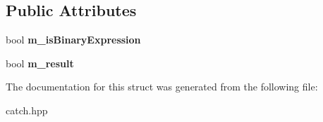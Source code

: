 \subsection*{Public Attributes}
\begin{DoxyCompactItemize}
\item 
bool {\bfseries m\+\_\+is\+Binary\+Expression}\hypertarget{structCatch_1_1ITransientExpression_a75ce48da824d514d08152d396abb28d8}{}\label{structCatch_1_1ITransientExpression_a75ce48da824d514d08152d396abb28d8}

\item 
bool {\bfseries m\+\_\+result}\hypertarget{structCatch_1_1ITransientExpression_a4646e2b5e0156e913653ec3b9b60c942}{}\label{structCatch_1_1ITransientExpression_a4646e2b5e0156e913653ec3b9b60c942}

\end{DoxyCompactItemize}


The documentation for this struct was generated from the following file\+:\begin{DoxyCompactItemize}
\item 
catch.\+hpp\end{DoxyCompactItemize}

